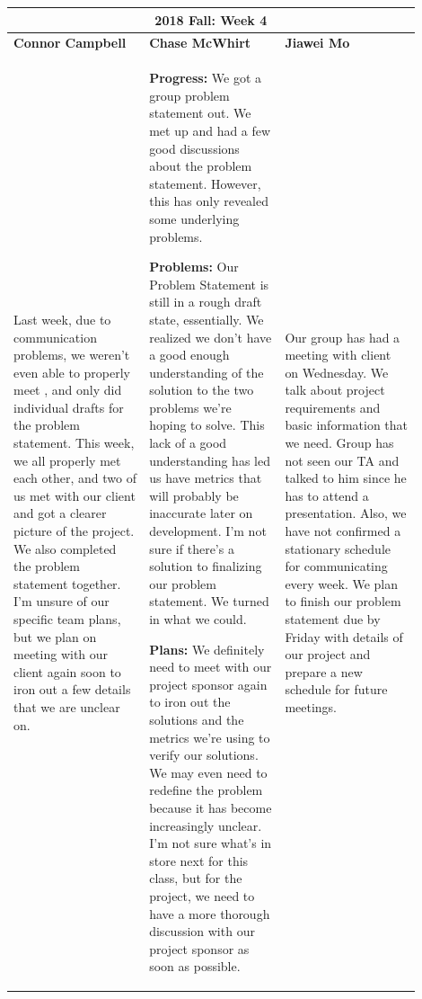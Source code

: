 \documentclass[10pt,journal,compsoc, draftclsnofoot,onecolumn]{IEEEtran}
\begin{document}
\begin{center}
\begin{tabular}{|p{0.3\linewidth}|p{0.3\linewidth}|p{0.3\linewidth}|}
\hline
\multicolumn{3}{|c|}{\textbf{2018 Fall: Week 4}} \\
\hline
\textbf{Connor Campbell} & \textbf{Chase McWhirt} & \textbf{Jiawei Mo} \\ [0.5ex]
\hline\hline

Last week, due to communication problems, we weren't even able to properly meet , and only did individual drafts for the problem statement. This week, we all properly met each other, and two of us met with our client and got a clearer picture of the project. We also completed the problem statement together. I'm unsure of our specific team plans, but we plan on meeting with our client again soon to iron out a few details that we are unclear on.
&
\textbf{Progress:} We got a group problem statement out.
We met up and had a few good discussions about the problem statement.
However, this has only revealed some underlying problems.

\textbf{Problems:} Our Problem Statement is still in a rough draft state, essentially.
We realized we don't have a good enough understanding of the solution to the two problems we're hoping to solve.
This lack of a good understanding has led us have metrics that will probably be inaccurate later on development.
I'm not sure if there's a solution to finalizing our problem statement.
We turned in what we could.

\textbf{Plans:} We definitely need to meet with our project sponsor again to iron out the solutions and the metrics we're using to verify our solutions.
We may even need to redefine the problem because it has become increasingly unclear.
I'm not sure what's in store next for this class, but for the project, we need to have a more thorough discussion with our project sponsor as soon as possible.
&
Our group has had a meeting with client on Wednesday. We talk about project requirements and basic information that we need. Group has not seen our TA and talked to him since he has to attend a presentation. Also, we have not confirmed a stationary schedule for communicating every week. We plan to finish our problem statement due by Friday with details of our project and prepare a new schedule for future meetings.
\\ \hline
\end{tabular}
\end{center}
\end{document}
